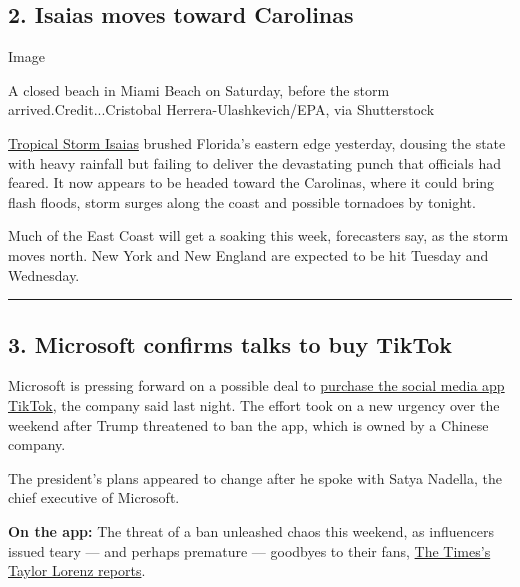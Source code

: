 \hypertarget{2-isaias-moves-toward-carolinas}{%
\subsection{2. Isaias moves toward
Carolinas}\label{2-isaias-moves-toward-carolinas}}

Image

A closed beach in Miami Beach on Saturday, before the storm
arrived.Credit...Cristobal Herrera-Ulashkevich/EPA, via Shutterstock

\href{https://www.nytimes.com/2020/08/02/us/tropical-storm-isaias-florida-carolina.html}{Tropical
Storm Isaias} brushed Florida's eastern edge yesterday, dousing the
state with heavy rainfall but failing to deliver the devastating punch
that officials had feared. It now appears to be headed toward the
Carolinas, where it could bring flash floods, storm surges along the
coast and possible tornadoes by tonight.

Much of the East Coast will get a soaking this week, forecasters say, as
the storm moves north. New York and New England are expected to be hit
Tuesday and Wednesday.

\begin{center}\rule{0.5\linewidth}{\linethickness}\end{center}

\hypertarget{3-microsoft-confirms-talks-to-buy-tiktok}{%
\subsection{3. Microsoft confirms talks to buy
TikTok}\label{3-microsoft-confirms-talks-to-buy-tiktok}}

Microsoft is pressing forward on a possible deal to
\href{https://www.nytimes.com/2020/08/02/business/economy/trump-tiktok-china-national-security.html}{purchase
the social media app TikTok}, the company said last night. The effort
took on a new urgency over the weekend after Trump threatened to ban the
app, which is owned by a Chinese company.

The president's plans appeared to change after he spoke with Satya
Nadella, the chief executive of Microsoft.

\textbf{On the app:} The threat of a ban unleashed chaos this weekend,
as influencers issued teary --- and perhaps premature --- goodbyes to
their fans,
\href{https://www.nytimes.com/2020/08/02/style/tiktok-ban-threat-trump.html}{The
Times's Taylor Lorenz reports}.

